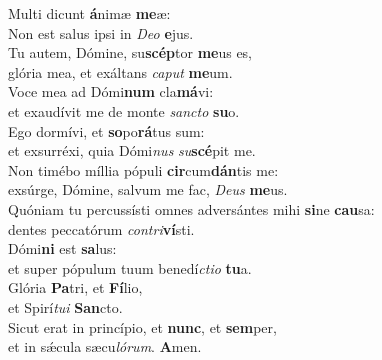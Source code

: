 \evenverse Multi dicunt \textbf{á}nimæ \textbf{me}æ:~\*\\
\evenverse Non est salus ipsi in \textit{De}\textit{o} \textbf{e}jus.\\
\oddverse Tu autem, Dómine, su\textbf{scép}tor \textbf{me}us es,~\*\\
\oddverse glória mea, et exáltans \textit{ca}\textit{put} \textbf{me}um.\\
\evenverse Voce mea ad Dómi\textbf{num} cla\textbf{má}vi:~\*\\
\evenverse et exaudívit me de monte \textit{san}\textit{cto} \textbf{su}o.\\
\oddverse Ego dormívi, et \textbf{so}po\textbf{rá}tus sum:~\*\\
\oddverse et exsurréxi, quia Dómi\textit{nus} \textit{su}\textbf{scé}pit me.\\
\evenverse Non timébo míllia pópuli \textbf{cir}cum\textbf{dán}tis me:~\*\\
\evenverse exsúrge, Dómine, salvum me fac, \textit{De}\textit{us} \textbf{me}us.\\
\oddverse Quóniam tu percussísti omnes adversántes mihi \textbf{si}ne \textbf{cau}sa:~\*\\
\oddverse dentes peccatórum \textit{con}\textit{tri}\textbf{ví}sti.\\
\evenverse Dómi\textbf{ni} est \textbf{sa}lus:~\*\\
\evenverse et super pópulum tuum benedí\textit{cti}\textit{o} \textbf{tu}a.\\
\oddverse Glória \textbf{Pa}tri, et \textbf{Fí}lio,~\*\\
\oddverse et Spirí\textit{tu}\textit{i} \textbf{San}cto.\\
\evenverse Sicut erat in princípio, et \textbf{nunc}, et \textbf{sem}per,~\*\\
\evenverse et in sǽcula sæcu\textit{ló}\textit{rum}. \textbf{A}men.\\
